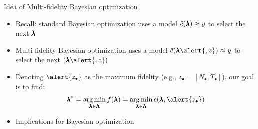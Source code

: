 \begin{frame}[c]{Idea of Multi-fidelity Bayesian optimization  }

\begin{itemize}
	\item Recall: standard Bayesian optimization uses a model $\hat{c}(\pmb{\lambda}) \approx y$ to select the next $\pmb{\lambda}$
\pause
\medskip
	\item \alert{Multi-fidelity} Bayesian optimization uses a model $\surro(\conf\alert{, z}) \approx y$ to select the next $(\conf\alert{, z})$
    \pause
    \bigskip
	
%   


    \item Denoting $\alert{z_{\bullet}}$ as the maximum fidelity (e.g., $z_{\bullet} = [N_{\bullet},T_{\bullet}]$), our goal is to find:
        \begin{equation*}
            \optconf = \argmin_{\conf \in \pcs} \func(\conf) = \argmin_{\conf \in \pcs} \surro(\conf, \alert{z_{\bullet}})
        \end{equation*}

    \pause
    \bigskip

    \item Implications for Bayesian optimization
\end{itemize}




\end{frame}

